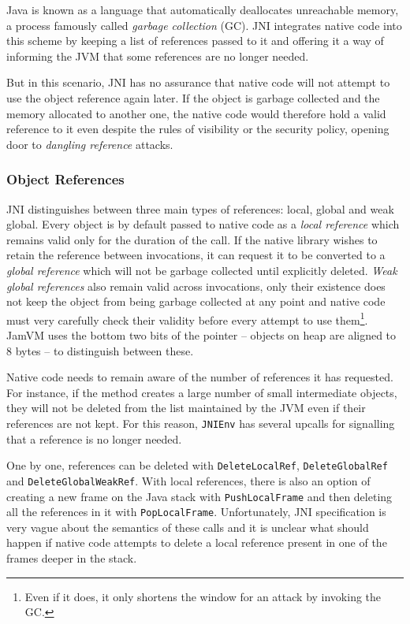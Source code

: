 \documentclass[a4paper,12pt,twoside,openright]{report}
\begin{document}
Java is known as a language that automatically deallocates unreachable memory, a process famously called \emph{garbage collection} (GC). JNI integrates native code into this scheme by keeping a list of references passed to it and offering it a way of informing the JVM that some references are no longer needed. 

But in this scenario, JNI has no assurance that native code will not attempt to use the object reference again later. If the object is garbage collected and the memory allocated to another one, the native code would therefore hold a valid reference to it even despite the rules of visibility or the security policy, opening door to \emph{dangling reference} attacks.

\subsubsection{Object References}
\label{sec:LocalAndGlobalRefs}

JNI distinguishes between three main types of references: local, global and weak global. Every object is by default passed to native code as a \emph{local reference} which remains valid only for the duration of the call. If the native library wishes to retain the reference between invocations, it can request it to be converted to a \emph{global reference} which will not be garbage collected until explicitly deleted. \emph{Weak global references} also remain valid across invocations, only their existence does not keep the object from being garbage collected at any point and native code must very carefully check their validity before every attempt to use them\footnote{Even if it does, it only shortens the window for an attack by invoking the GC.}. JamVM uses the bottom two bits of the pointer -- objects on heap are aligned to 8 bytes -- to distinguish between these.

Native code needs to remain aware of the number of references it has requested. For instance, if the method creates a large number of small intermediate objects, they will not be deleted from the list maintained by the JVM even if their references are not kept. For this reason, \texttt{JNIEnv} has several upcalls for signalling that a reference is no longer needed. 

One by one, references can be deleted with \texttt{DeleteLocalRef}, \texttt{DeleteGlobalRef} and \texttt{DeleteGlobalWeakRef}. With local references, there is also an option of creating a new frame on the Java stack with \texttt{PushLocalFrame} and then deleting all the references in it with \texttt{PopLocalFrame}. Unfortunately, JNI specification is very vague about the semantics of these calls and it is unclear what should happen if native code attempts to delete a local reference present in one of the frames deeper in the stack.
\end{document}
